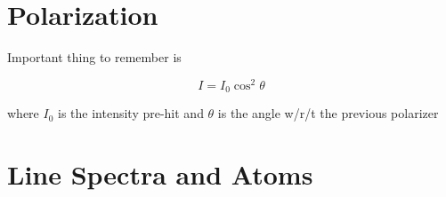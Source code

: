 \documentclass[twocolumn,draft]{article}
\begin{document}
\section*{Polarization}

Important thing to remember is

\begin{equation*}
	I = I_{0}\cos^{2}{\theta}
\end{equation*}

where $I_{0}$ is the intensity pre-hit and $\theta$ is the angle w/r/t the previous polarizer

\section*{Line Spectra and Atoms}

  
\end{document}
